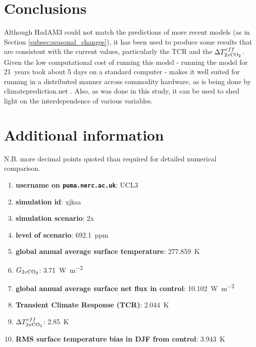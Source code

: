 \documentclass{article}
\begin{document}
\section{Conclusions}

Although HadAM3 could not match the predictions of more recent models (as in Section \ref{subsec:seasonal_changes}), it has been used to produce some results that are consistent with the current values, particularly the TCR and the $\Delta T^{eff}_{2x\ce{CO2}}$. Given the low computational cost of running this model - running the model for \SI{21}{years} took about 5 days on a standard computer - makes it well suited for running in a distributed manner across commodity hardware,  as is  being done by climateprediction.net \parencite{stainforth2005uncertainty}. Also, as was done in this study, it can be used to shed light on the interdependence of various variables.

\printbibliography
\appendix 

\section{Additional information}

N.B. more decimal points quoted than required for detailed numerical comparison.

\begin{enumerate}
    \item \textbf{username on \texttt{puma.nerc.ac.uk}}: UCL3
    \item \textbf{simulation id}: xjksa
    \item \textbf{simulation scenario}: 2x
    \item \textbf{ level of scenario}: \SI{692.1}{ppm}
    \item \textbf{global annual average surface temperature}: \SI{277.859}{K}
    \item \textbf{$G_{2x\ce{CO2}}$}: \SI{3.71}{W.m^{-2}}
    \item \textbf{global annual average surface net flux in control}: \SI{10.102}{W.m^{-2}}
    \item \textbf{Transient Climate Response (TCR)}: \SI{2.044}{K}
    \item \textbf{$\Delta T^{eff}_{2x\ce{CO2}}$}: \SI{2.85}{K}
    \item \textbf{RMS surface temperature bias in DJF from control}: \SI{3.943}{K} %
\end{enumerate}
\end{document}
